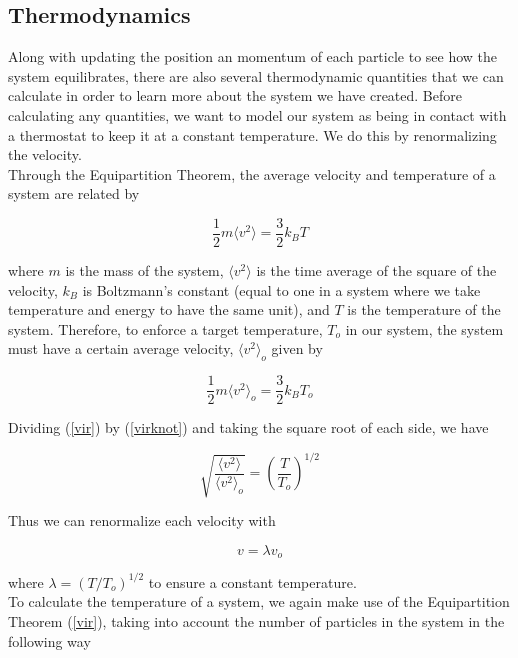 \documentclass{article}
\begin{document}
\begin{multicols}{2}
\subsection{Thermodynamics}
\label{thermo}

Along with updating the position an momentum of each particle to see how the system equilibrates, there are also several thermodynamic quantities that we can calculate in order to learn more about the system we have created.  Before calculating any quantities, we want to model our system as being in contact with a thermostat to keep it at a constant temperature.  We do this by renormalizing the velocity.  \\

Through the Equipartition Theorem, the average velocity and temperature of a system are related by

\begin{equation}
\label{vir}
\frac{1}{2}m \langle v^2 \rangle = \frac{3}{2} k_B T
\end{equation}

\noindent where $m$ is the mass of the system, $\langle v^2 \rangle$ is the time average of the square of the velocity, $k_B$ is Boltzmann's constant (equal to one in a system where we take temperature and energy to have the same unit), and $T$ is the temperature of the system.  Therefore, to enforce a target temperature, $T_o$ in our system, the system must have a certain average velocity, $\langle v^2 \rangle _o$ given by

\begin{equation}
\label{virknot}
\frac{1}{2}m \langle v^2 \rangle _o = \frac{3}{2} k_B T_o
\end{equation}

Dividing (\ref{vir}) by (\ref{virknot}) and taking the square root of each side, we have

\begin{equation}
\sqrt{\frac{\langle v^2 \rangle}{\langle v^2 \rangle _o}} = \left ( \frac{T}{T_o} \right ) ^{1/2}
\end{equation}

\noindent Thus we can renormalize each velocity with 

\begin{equation}
v = \lambda v_o
\end{equation}

\noindent where $\lambda = (T/T_o)^{1/2}$ to ensure a constant temperature.  \\

To calculate the temperature of a system, we again make use of the Equipartition Theorem (\ref{vir}), taking into account the number of particles in the system in the following way


\end{multicols}
\end{document}
